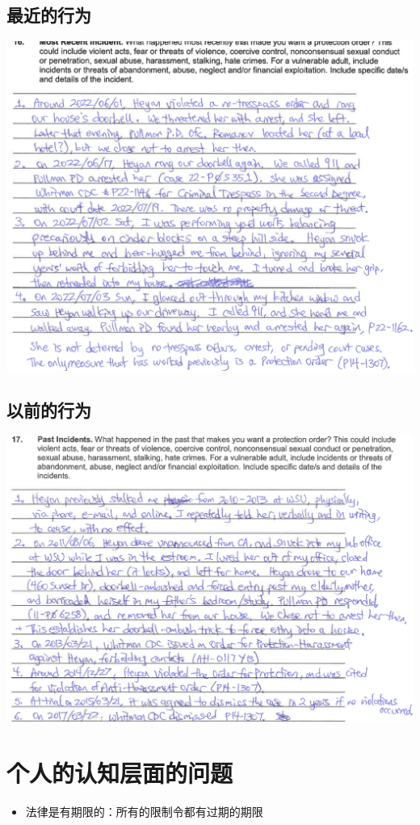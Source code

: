 \documentclass[9pt, b5paaper]{book}
\begin{document}
\section{最近的行为}
\label{sec-1-3}

\includegraphics[width=.9\linewidth]{./pic/dearCousin_20220919_153946.png}
\section{以前的行为}
\label{sec-1-4}

\includegraphics[width=.9\linewidth]{./pic/dearCousin_20220919_154045.png}

\chapter{个人的认知层面的问题　　}
\label{sec-2}
\begin{itemize}
\item 法律是有期限的：所有的限制令都有过期的期限
\end{itemize}
\end{document}

